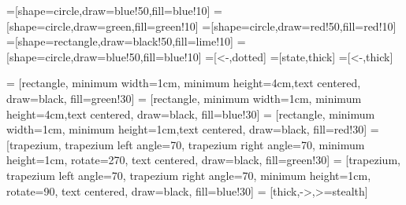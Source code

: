 \newcommand{\R}{{\mathds{R}}}
\newcommand{\Q}{{\mathbb{Q}}}
\newcommand{\E}{{\mathbb{E}}}
\newcommand{\x}{{\mathbf{x}}}
\newcommand{\z}{{\mathbf{z}}}
\newcommand{\y}{{\mathbf{y}}}
\newcommand{\EQ}{{\E^\Q}}
\newcommand{\mubar}{\bar{\mu}}
\newcommand{\tmu}{\tilde{\mu}}
\newcommand{\tpi}{\tilde{\pi}}
\newcommand{\tsig}{\tilde{\sigma}}
\newcommand{\tp}{\tilde{p}}

\newcommand{\Id}{{\mathds{1}}}
\newcommand{\new}[1]{#1}


=[shape=circle,draw=blue!50,fill=blue!10]
=[shape=circle,draw=green,fill=green!10]
=[shape=circle,draw=red!50,fill=red!10]
=[shape=rectangle,draw=black!50,fill=lime!10]
=[shape=circle,draw=blue!50,fill=blue!10]
=[<-,dotted]
=[state,thick]
=[<-,thick]

 = [rectangle, minimum width=1cm, minimum height=4cm,text centered, draw=black, fill=green!30]
 = [rectangle, minimum width=1cm, minimum height=4cm,text centered, draw=black, fill=blue!30]
 = [rectangle, minimum width=1cm, minimum height=1cm,text centered, draw=black, fill=red!30]
 = [trapezium, trapezium left angle=70, trapezium right angle=70, minimum height=1cm, rotate=270, text centered, draw=black, fill=green!30]
 = [trapezium, trapezium left angle=70, trapezium right angle=70, minimum height=1cm, rotate=90, text centered, draw=black, fill=blue!30]
 = [thick,->,>=stealth] 
